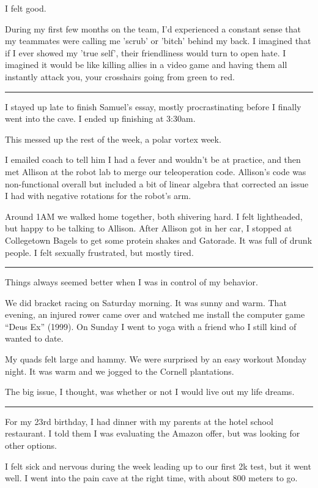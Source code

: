 I felt good.

During my first few months on the team, I'd experienced a constant sense that my
teammates were calling me 'scrub' or 'bitch' behind my back.  I imagined that if
I ever showed my 'true self', their friendliness would turn to open hate.  I
imagined it would be like killing allies in a video game and having them all
instantly attack you, your crosshairs going from green to red. 

\plainfancybreak{12pt}{2}{* * *}

I stayed up late to finish Samuel's essay, mostly procrastinating before I
finally went into the cave.  I ended up finishing at 3:30am.

This messed up the rest of the week, a polar vortex week.

I emailed coach to tell him I had a fever and wouldn't be at practice, and then
met Allison at the robot lab to merge our teleoperation code.   Allison's code
was non-functional overall but included a bit of linear algebra that corrected
an issue I had with negative rotations for the robot's arm.

Around 1AM we walked home together, both shivering hard.  I felt lightheaded,
but happy to be talking to Allison.  After Allison got in her car, I stopped at
Collegetown Bagels to get some protein shakes and Gatorade.  It was full of
drunk people.  I felt sexually frustrated, but mostly tired.

\plainfancybreak{12pt}{2}{* * *}

Things always seemed better when I was in control of my behavior.

We did bracket racing on Saturday morning.  It was sunny and warm.  That
evening, an injured rower came over and watched me install the computer game
``Deus Ex'' (1999).   On Sunday I went to yoga with a friend who I still kind of
wanted to date.

My quads felt large and hammy.  We were surprised by an easy workout Monday
night.  It was warm and we jogged to the Cornell plantations.

The big issue, I thought, was whether or not I would live out my life dreams.

\plainfancybreak{12pt}{2}{* * *}

For my 23rd birthday, I had dinner with my parents at the hotel school
restaurant.  I told them I was evaluating the Amazon offer, but was looking for
other options.


I felt sick and nervous during the week leading up to our first 2k test, but it
went well.  I went into the pain cave at the right time, with about 800 meters
to go.  

